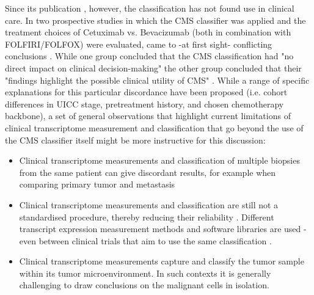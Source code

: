 \begin{flushleft}
Since its publication \parencite{guinneyConsensusMolecularSubtypes2015}, however, the classification has not found use in clinical care. In two prospective studies in which the CMS classifier was applied and the treatment choices of Cetuximab vs. Bevacizumab (both in combination with FOLFIRI/FOLFOX) were evaluated, came to -at first sight- conflicting conclusions \parencite{stintzingConsensusMolecularSubgroups2019, lenzImpactConsensusMolecular2019, aderkaExplainingUnexplainableDiscrepancies2019, sveenPredictiveModelingColorectal2019}. While one group concluded that the CMS classification had "no direct impact on clinical decision-making" \parencite{stintzingConsensusMolecularSubgroups2019,} the other group concluded that their "findings highlight the possible clinical utility of CMS" \parencite{lenzImpactConsensusMolecular2019}. While a range of specific explanations for this particular discordance have been proposed (i.e. cohort differences in UICC stage, pretreatment history, and chosen chemotherapy backbone), a set of general observations that highlight current limitations of clinical transcriptome measurement and classification that go beyond the use of the CMS classifier itself might be more instructive for this discussion: 

\begin{itemize} 
    \item Clinical transcriptome measurements and classification of multiple biopsies from the same patient can give discordant results, for example when comparing primary tumor and metastasis \parencite{eideMetastaticHeterogeneityConsensus2021}  
    \item Clinical transcriptome measurements and classification are still not a standardised procedure, thereby reducing their reliability \parencite{sveenPredictiveModelingColorectal2019}. Different transcript expression measurement methods and software libraries are used - even between clinical trials that aim to use the same classification \parencite{stintzingConsensusMolecularSubgroups2019, lenzImpactConsensusMolecular2019}.
    \item Clinical transcriptome measurements capture and classify the tumor sample within its tumor microenvironment. In such contexts it is generally challenging to draw conclusions on the malignant cells in isolation.
\end{itemize}


\end{flushleft}
